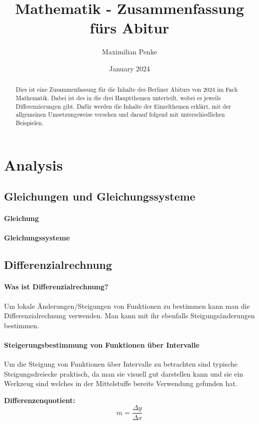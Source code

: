 \documentclass{article}
\title{Mathematik - Zusammenfassung fürs Abitur}
\author{Maximilian Penke}
\date{January 2024}
\begin{document}
\maketitle

\begin{abstract}
    Dies ist eine Zusammenfassung für die Inhalte des Berliner Abiturs von 2024 im Fach Mathematik. Dabei ist des in die drei Hauptthemen unterteilt, wobei es jeweils Differenzierungen gibt. Dafür werden die Inhalte der Einzelthemen erklärt, mit der allgemeinen Umsetzungsweise versehen und darauf folgend mit unterschiedlichen Beispielen.
\end{abstract}

\tableofcontents
\newpage

\section{Analysis}
\subsection{Gleichungen und Gleichungssysteme}
\paragraph{Gleichung}
\paragraph{Gleichungssysteme}
\subsection{Differenzialrechnung}
\paragraph{Was ist Differenzialrechnung?}
Um lokale Änderungen/Steigungen von Funktionen zu bestimmen kann man die Differenzialrechnung verwenden.
Man kann mit ihr ebenfalls Steigungsänderungen bestimmen.
\paragraph{Steigerungsbestimmung von Funktionen über Intervalle}
Um die Steigung von Funktionen über Intervalle zu betrachten sind typische Steigungsdreiecke praktisch,
da man sie visuell gut darstellen kann und sie ein Werkzeug sind welches in der Mittelstuffe bereits
Verwendung gefunden hat.

\bf{Differenzenquotient:}
\[
    m = {\frac {\Delta y} {\Delta x}}
\]
\end{document}
